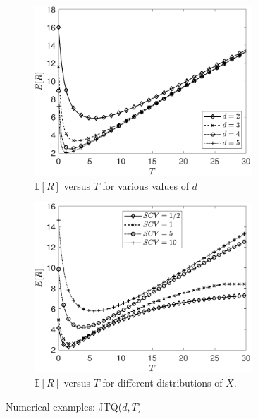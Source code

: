 \documentclass[12pt]{report}
\newcommand{\E}{\mathbb{E}}
\begin{document}
\begin{figure}[t]
	\begin{subfigure}{.44\textwidth}
		\begin{center}
		\includegraphics[width=0.9\textwidth]{figures/Chapter4/plot_MRT_ifoT_JTQ_diffd.pdf}
		\caption{$\E[R]$ versus $T$ for various values of $d$}
		\label{fig:JTQ1}
		\end{center}
	\end{subfigure}
	\begin{subfigure}{.44\textwidth}
		\begin{center}
		\includegraphics[width=0.9\textwidth]{figures/Chapter4/plot_MRT_ifoT_JTQ_diffdists.pdf}
		\caption{$\E[R]$ versus $T$ for different distributions of $\tilde X$.}
		\label{fig:JTQ2}
		\end{center}
	\end{subfigure}
	\caption{Numerical examples: JTQ($d,T$)}
\end{figure} 
\end{document}
